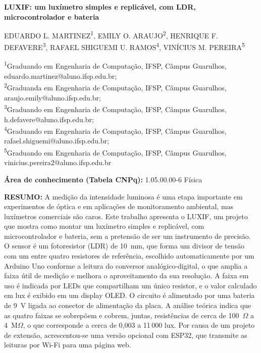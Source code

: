 \documentclass[11pt,a4paper]{article}
\begin{document}
\begin{center}
	{\Large\bfseries LUXIF: um luxímetro simples e replicável, com LDR, microcontrolador e bateria}

	\vspace{12pt}

	{\small
	EDUARDO L. MARTINEZ\textsuperscript{1}, EMILY O. ARAUJO\textsuperscript{2},
	HENRIQUE F. DEFAVERE\textsuperscript{3}, RAFAEL SHIGUEMI U. RAMOS\textsuperscript{4},
	VINÍCIUS M. PEREIRA\textsuperscript{5}}
\end{center}

\vspace{4pt}
{\footnotesize
\noindent\textsuperscript{1}Graduando em Engenharia de Computação, IFSP, Câmpus Guarulhos, eduardo.martinez@aluno.ifsp.edu.br;\\
\textsuperscript{2}Graduanda em Engenharia de Computação, IFSP, Câmpus Guarulhos, araujo.emily@aluno.ifsp.edu.br;\\
\textsuperscript{3}Graduando em Engenharia de Computação, IFSP, Câmpus Guarulhos, h.defavere@aluno.ifsp.edu.br;\\
\textsuperscript{4}Graduando em Engenharia de Computação, IFSP, Câmpus Guarulhos, rafael.shiguemi@aluno.ifsp.edu.br;\\
\textsuperscript{5}Graduando em Engenharia de Computação, IFSP, Câmpus Guarulhos, vinicius.pereira2@aluno.ifsp.edu.br}

\vspace{8pt}
\noindent\textbf{Área de conhecimento (Tabela CNPq):} 1.05.00.00-6 Física

\vspace{8pt}
\noindent\textbf{RESUMO:} A medição da intensidade luminosa é uma etapa importante em experimentos de óptica e em aplicações de monitoramento ambiental, mas luxímetros comerciais são caros. Este trabalho apresenta o LUXIF, um projeto que mostra como montar um luxímetro simples e replicável, com microcontrolador e bateria, sem a pretensão de ser um instrumento de precisão. O sensor é um fotoresistor (LDR) de 10~mm, que forma um divisor de tensão com um entre quatro resistores de referência, escolhido automaticamente por um Arduino Uno conforme a leitura do conversor analógico-digital, o que amplia a faixa útil de medição e melhora o aproveitamento da sua resolução. A faixa em uso é indicada por LEDs que compartilham um único resistor, e o valor calculado em lux é exibido em um display OLED. O circuito é alimentado por uma bateria de 9~V ligada ao conector de alimentação da placa. A análise teórica indica que as quatro faixas se sobrepõem e cobrem, juntas, resistências de cerca de 100~$\Omega$ a 4~M$\Omega$, o que corresponde a cerca de 0,003 a 11\,000 lux. Por causa de um projeto de extensão, acrescentou-se uma versão opcional com ESP32, que transmite as leituras por Wi-Fi para uma página web.
\end{document}
